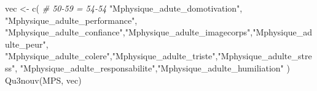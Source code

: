 \documentclass[
]{article}
\newenvironment{Shaded}{\begin{snugshade}}{\end{snugshade}}
\newcommand{\CommentTok}[1]{\textcolor[rgb]{0.56,0.35,0.01}{\textit{#1}}}
\newcommand{\FunctionTok}[1]{\textcolor[rgb]{0.00,0.00,0.00}{#1}}
\newcommand{\NormalTok}[1]{#1}
\newcommand{\OtherTok}[1]{\textcolor[rgb]{0.56,0.35,0.01}{#1}}
\newcommand{\StringTok}[1]{\textcolor[rgb]{0.31,0.60,0.02}{#1}}
\begin{document}
\begin{Shaded}
\begin{Highlighting}[]
\NormalTok{vec }\OtherTok{\textless{}{-}} \FunctionTok{c}\NormalTok{(   }\CommentTok{\# 50{-}59 = 54{-}54}
  \StringTok{"Mphysique\_adute\_domotivation"}\NormalTok{,}
  \StringTok{"Mphysique\_adulte\_performance"}\NormalTok{,}
  \StringTok{"Mphysique\_adulte\_confiance"}\NormalTok{,}\StringTok{"Mphysique\_adulte\_imagecorps"}\NormalTok{,}\StringTok{"Mphysique\_adulte\_peur"}\NormalTok{,}
  \StringTok{"Mphysique\_adulte\_colere"}\NormalTok{,}\StringTok{"Mphysique\_adulte\_triste"}\NormalTok{,}\StringTok{"Mphysique\_adulte\_stress"}\NormalTok{,}
  \StringTok{"Mphysique\_adulte\_responsabilite"}\NormalTok{,}\StringTok{"Mphysique\_adulte\_humiliation"}
\NormalTok{     )}
\FunctionTok{Qu3nouv}\NormalTok{(MPS, vec)}
\end{Highlighting}
\end{Shaded}
\end{document}
